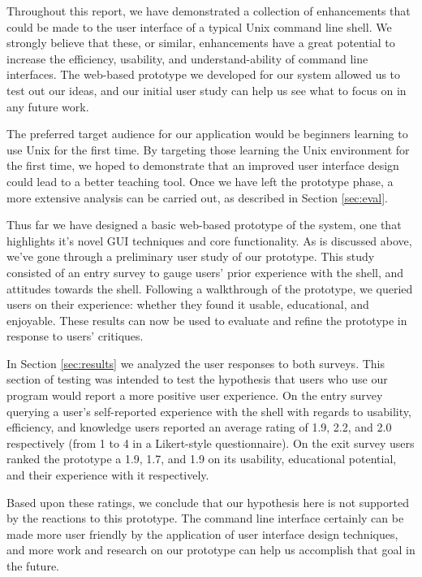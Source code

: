 Throughout this report, we have demonstrated a collection of enhancements that
could be made to the user interface of a typical Unix command line shell. We
strongly believe that these, or similar, enhancements have a great potential to
increase the efficiency, usability, and understand-ability of command line
interfaces. The web-based prototype we developed for our system allowed us to
test out our ideas, and our initial user study can help us see what to focus on
in any future work.

The preferred target audience for our application would be beginners learning to
use Unix for the first time. By targeting those learning the Unix environment
for the first time, we hoped to demonstrate that an improved user interface
design could lead to a better teaching tool. Once we have left the prototype
phase, a more extensive analysis can be carried out, as described in Section
\ref{sec:eval}.

Thus far we have designed a basic web-based prototype of the system, one that
highlights it's novel GUI techniques and core functionality. As is discussed
above, we've gone through a preliminary user study of our prototype. This study
consisted of an entry survey to gauge users' prior experience with the shell,
and attitudes towards the shell. Following a walkthrough of the prototype, we
queried users on their experience: whether they found it usable, educational,
and enjoyable. These results can now be used to evaluate and refine the
prototype in response to users' critiques.

In Section \ref{sec:results} we analyzed the user responses to both surveys. This
section of testing was intended to test the hypothesis that users who use our
program would report a more positive user experience. On the entry survey
querying a user's self-reported experience with the shell with regards to
usability, efficiency, and knowledge users reported an average rating of 1.9,
2.2, and 2.0 respectively (from 1 to 4 in a Likert-style questionnaire). On the
exit survey users ranked the prototype a 1.9, 1.7, and 1.9 on its usability,
educational potential, and their experience with it respectively.

Based upon these ratings, we conclude that our hypothesis here is not supported
by the reactions to this prototype. The command line interface certainly can be
made more user friendly by the application of user interface design techniques,
and more work and research on our prototype can help us accomplish that goal in
the future.




